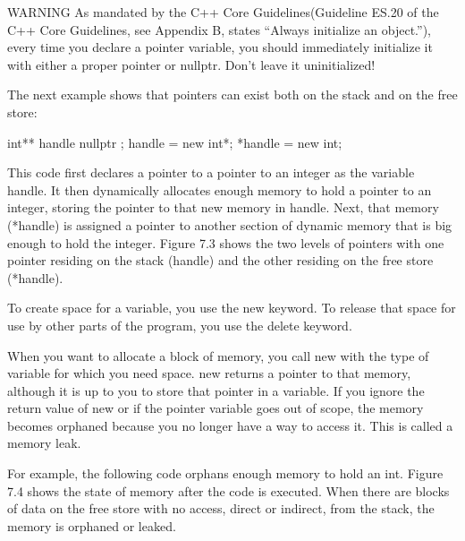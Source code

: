 \begin{myWarning}{WARNING}
As mandated by the C++ Core Guidelines(Guideline ES.20 of the C++ Core Guidelines, see Appendix B, states “Always initialize an object.”), every time you declare a pointer variable, you should immediately initialize it with either a proper pointer or nullptr. Don’t leave it uninitialized!
\end{myWarning}

The next example shows that pointers can exist both on the stack and on the free store:

\begin{cpp}
int** handle { nullptr };
handle = new int*;
*handle = new int;
\end{cpp}

This code first declares a pointer to a pointer to an integer as the variable handle. It then dynamically allocates enough memory to hold a pointer to an integer, storing the pointer to that new memory in handle. Next, that memory (*handle) is assigned a pointer to another section of dynamic memory that is big enough to hold the integer. Figure 7.3 shows the two levels of pointers with one pointer residing on the stack (handle) and the other residing on the free store (*handle).



To create space for a variable, you use the new keyword. To release that space for use by other parts of the program, you use the delete keyword.


When you want to allocate a block of memory, you call new with the type of variable for which you need space. new returns a pointer to that memory, although it is up to you to store that pointer in a variable. If you ignore the return value of new or if the pointer variable goes out of scope, the memory becomes orphaned because you no longer have a way to access it. This is called a memory leak.

For example, the following code orphans enough memory to hold an int. Figure 7.4 shows the state of memory after the code is executed. When there are blocks of data on the free store with no access, direct or indirect, from the stack, the memory is orphaned or leaked.


